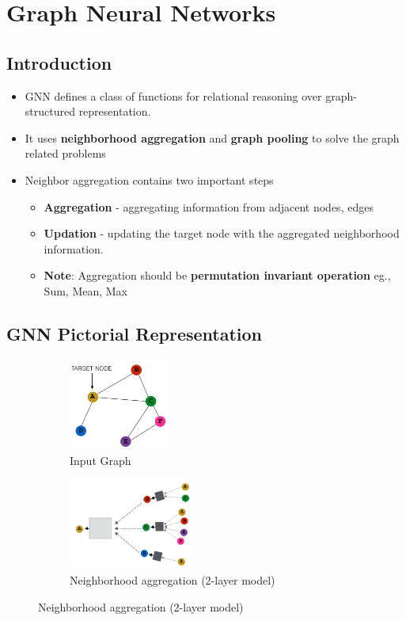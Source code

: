 \chapter{Graph Neural Networks}

\section{Introduction}
    \begin{itemize}
        \item GNN defines a class of functions for relational reasoning over graph-structured representation.
        \item It uses \textbf{neighborhood aggregation} and \textbf{graph pooling} to solve the graph related problems
        \item Neighbor aggregation contains two important steps
        \begin{itemize}
            \item \textbf{Aggregation} - aggregating information from adjacent nodes, edges
            \item \textbf{Updation} - updating the target node with the aggregated neighborhood information.
            \item \textbf{Note}: Aggregation should be \textbf{permutation invariant operation} eg., Sum, Mean, Max
        \end{itemize}
    \end{itemize}
    
\section{GNN Pictorial Representation}
    \begin{figure}[h]
    \centering
    \begin{subfigure}[b]{0.3\textwidth}
                \includegraphics[width=\textwidth,height=3cm]{tex/img/Eggraph.png}
                \caption{Input Graph}
        \end{subfigure}%
        \hfill
    \begin{subfigure}[b]{0.5\textwidth}
                \includegraphics[width=\textwidth,height=3cm]{tex/img/GNNmodel.png}
                \caption{Neighborhood aggregation (2-layer model)}
       \end{subfigure}%
    \end{figure}

